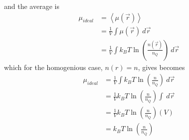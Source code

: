 \documentclass[double,12pt]{revtex4-2}
\begin{document}
and the %
average is
\begin{align}
    \mu_{ideal} &= \left<\mu(\vec r)\right>  \\
        &=  \frac{1}{V}\int \mu(\vec r)~d\vec r~ \\
        &= \frac{1}{V}\int k_BT\ln\left(\frac{n(\vec r)}{n_Q}\right)~d\vec r~ 
\end{align}
which for the homogenious case, $n(r)=n$, gives becomes
\begin{align}
    \mu_{ideal} &= \frac{1}{V}\int k_BT\ln\left(\frac{n}{n_Q}\right)~d\vec r~ \\
        &= \frac{1}{V}k_BT\ln\left(\frac{n}{n_Q}\right)\int ~d\vec r~ \\
        &= \frac{1}{V}k_BT\ln\left(\frac{n}{n_Q}\right)(V) \\
        &= k_BT\ln\left(\frac{n}{n_Q}\right) 
\end{align}

\end{document}
